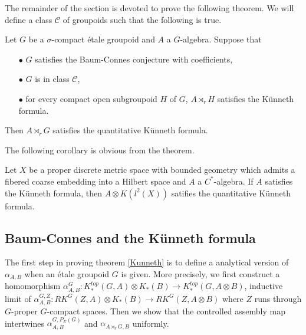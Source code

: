 The remainder of the section is devoted to prove the following theorem. We will define a class $\mathcal C$ of groupoids such that the following is true.

\begin{thm}\label{Kunneth}
Let $G$ be a $\sigma$-compact étale groupoid and $A$ a $G$-algebra. Suppose that 
\begin{itemize}
\item[$\bullet$] $G$ satisfies the Baum-Connes conjecture with coefficients,
\item[$\bullet$] $G$ is in class $\mathcal C$,
\item[$\bullet$] for every compact open subgroupoid $H$ of $G$, $A\rtimes_r H$ satisfies the Künneth formula.
\end{itemize} 
Then $A\rtimes_r G$ satisfies the quantitative Künneth formula.
\end{thm}

The following corollary is obvious from the theorem.\cite{FinnSellFibred}

\begin{cor}
Let $X$ be a proper discrete metric space with bounded geometry which admits a fibered coarse embedding into a Hilbert space and $A$ a $C^*$-algebra. If $A$ satisfies the Künneth formula, then $A\otimes K(l^2(X))$ satifies the quantitative Künneth formula.
\end{cor}


\subsection{Baum-Connes and the Künneth formula}
The first step in proving theorem \ref{Kunneth} is to define a analytical version of $\alpha_{A,B}$ when an étale groupoid $G$ is given. More precisely, we first construct a homomorphism $\alpha_{A,B}^G : K_*^{top}(G,A)\otimes K_*(B)\rightarrow K_*^{top}(G,A\otimes B )$, inductive limit of $\alpha_{A,B}^{G,Z} : RK^G(Z,A)\otimes K_*(B)\rightarrow RK^G(Z,A\otimes B )$ where $Z$ runs through $G$-proper $G$-compact spaces. Then we show that the controlled assembly map intertwines $\alpha^{G,P_E(G)}_{A,B}$ and $\alpha_{A\rtimes_r G,B}$ uniformly.\\

